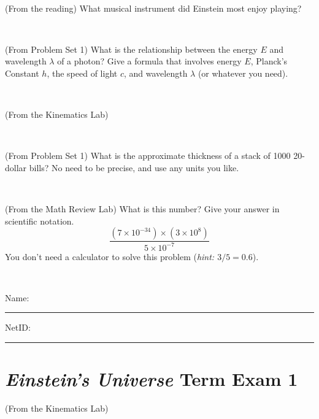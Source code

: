 \documentclass[12pt, letterpaper]{article}
\begin{document}
\vfill ~

\begin{problem} (From the reading)
What musical instrument did Einstein most enjoy playing?
\end{problem}


\vfill ~


\clearpage


\begin{problem} (From Problem Set 1)
What is the relationship between the energy $E$ and wavelength
$\lambda$ of a photon? Give a formula that involves energy $E$,
Planck's Constant $h$, the speed of light $c$, and wavelength
$\lambda$ (or whatever you need).
\end{problem}

\vfill ~

\begin{problem} (From the Kinematics Lab)

\end{problem}


\vfill ~

\begin{problem} (From Problem Set 1)
What is the approximate thickness of a stack of 1000 20-dollar bills?
No need to be precise, and use any units you like.
\end{problem}


\vfill ~

\begin{problem} (From the Math Review Lab)
What is this number? Give your answer in scientific notation.
$$
\frac{(7\times10^{-34})\times(3\times10^8)}{5\times10^{-7}}
$$
You don't need a calculator to solve this problem (\textit{hint: $3/5=0.6$}).
\end{problem}


\vfill ~


\cleardoublepage



\noindent
Name: \rule[-1ex]{0.60\textwidth}{0.1pt}
NetID: \rule[-1ex]{0.20\textwidth}{0.1pt}

\section*{\textsl{Einstein's Universe} Term Exam 1}
\setcounter{problem}{1}


\begin{problem} (From the Kinematics Lab)

\end{problem}
\end{document}
